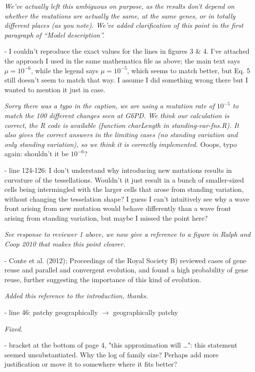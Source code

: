 \documentclass[12pt,letterpaper]{article}
\newcommand{\plr}[1]{{ \color{green} #1}}
\newcommand{\response}[1]{\emph{ \color{blue} #1}}
\begin{document}
\response{We've actually left this ambiguous on purpose, as the results don't depend on whether the mutations are actually the same,
at the same genes, or in totally different places (as you note).  We've added clarification of this point in the first paragraph of ``Model description''.}

- I couldn't reproduce the exact values for the lines in figures 3 \& 4. I've attached the approach I used in the same mathematica file as above; the main text says $\mu = 10^{-6}$, while the legend says $\mu=10^{-5}$, which seems to match better, but Eq. 5 still doesn't seem to match that way. I assume I did something wrong there but I wanted to mention it just in case.

\response{Sorry there was a typo in the caption, we are using a mutation rate of $10^{-5}$ to match the 100 different changes seen at G6PD. We think our calculation is correct, the R code is available (function charLength in standing-var-fns.R). It also gives the correct answers in the limiting cases (no standing variation and only standing variation), so we think it is correctly implemented.}
\plr{Ooops, typo again: shouldn't it be $10^{-6}$?}


- line 124-126: I don't understand why introducing new mutations results in curvature of the tessellations. Wouldn't it just result in a bunch of smaller-sized cells being intermingled with the larger cells that arose from standing variation, without changing the tesselation shape? I guess I can't intuitively see why a wave front arising from new mutation would behave differently than a wave front arising from standing variation, but maybe I missed the point here?

\response{See response to reviewer 1 above, we now give a reference to a figure in Ralph and Coop 2010 that makes this point clearer.}

- Conte et al. (2012); Proceedings of the Royal Society B) reviewed cases of gene reuse and parallel and convergent evolution, and found a high probability of gene reuse, further suggesting the importance of this kind of evolution.

\response{Added this reference to the introduction, thanks.}

- line 46: patchy geographically $\rightarrow$ geographically patchy

\response{Fixed.}

- bracket at the bottom of page 4, "this approximation will \ldots": this statement seemed unsubstantiated. Why the log of family size? Perhaps add more justification or move it to somewhere where it fits better?
\end{document}
